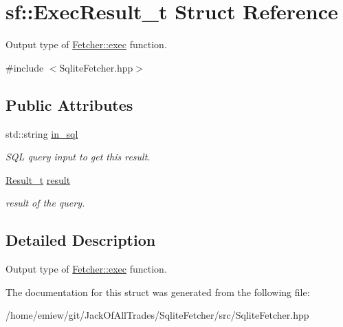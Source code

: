 \hypertarget{structsf_1_1ExecResult__t}{}\section{sf\+:\+:Exec\+Result\+\_\+t Struct Reference}
\label{structsf_1_1ExecResult__t}


Output type of \hyperlink{classsf_1_1Fetcher_a1f89a1897ae6f8f4aaf66e4a81a2ac23}{Fetcher\+::exec} function.  




{\ttfamily \#include $<$Sqlite\+Fetcher.\+hpp$>$}

\subsection*{Public Attributes}
\begin{DoxyCompactItemize}
\item 
\mbox{\label{structsf_1_1ExecResult__t_a3c3438d4bc4cf7979e66245e741585ac}} 
std\+::string \hyperlink{structsf_1_1ExecResult__t_a3c3438d4bc4cf7979e66245e741585ac}{in\+\_\+sql}
\begin{DoxyCompactList}\small\item\em S\+QL query input to get this result. \end{DoxyCompactList}\item 
\mbox{\label{structsf_1_1ExecResult__t_af4ebaf679d3ea5ddbd7b7a98250514f4}} 
\hyperlink{namespacesf_a32e7fd33812e38a9ac4df7652c3adec2}{Result\+\_\+t} \hyperlink{structsf_1_1ExecResult__t_af4ebaf679d3ea5ddbd7b7a98250514f4}{result}
\begin{DoxyCompactList}\small\item\em result of the query. \end{DoxyCompactList}\end{DoxyCompactItemize}


\subsection{Detailed Description}
Output type of \hyperlink{classsf_1_1Fetcher_a1f89a1897ae6f8f4aaf66e4a81a2ac23}{Fetcher\+::exec} function. 

The documentation for this struct was generated from the following file\+:\begin{DoxyCompactItemize}
\item 
/home/emiew/git/\+Jack\+Of\+All\+Trades/\+Sqlite\+Fetcher/src/Sqlite\+Fetcher.\+hpp\end{DoxyCompactItemize}
